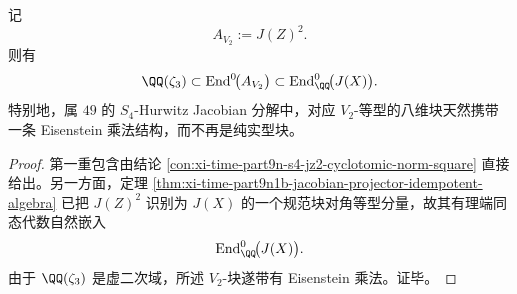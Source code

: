 \begin{corollary}\label{cor:xi-time-part9n1a-v2-block-eisenstein-multiplication}
记
\[
A_{V_2}:=J(Z)^2.
\]
则有
\[
\QQ(\zeta_3)\subset \operatorname{End}^0\!\bigl(A_{V_2}\bigr)
\subset
\operatorname{End}^0_{\QQ}\!\bigl(J(X)\bigr).
\]
特别地，属 \(49\) 的 \(S_4\)-Hurwitz Jacobian 分解中，对应 \(V_2\)-等型的八维块天然携带一条 Eisenstein 乘法结构，而不再是纯实型块。
\end{corollary}
\begin{proof}
第一重包含由结论 \ref{con:xi-time-part9n-s4-jz2-cyclotomic-norm-square} 直接给出。另一方面，定理 \ref{thm:xi-time-part9n1b-jacobian-projector-idempotent-algebra} 已把 \(J(Z)^2\) 识别为 \(J(X)\) 的一个规范块对角等型分量，故其有理端同态代数自然嵌入
\[
\operatorname{End}^0_{\QQ}\!\bigl(J(X)\bigr).
\]
由于 \(\QQ(\zeta_3)\) 是虚二次域，所述 \(V_2\)-块遂带有 Eisenstein 乘法。证毕。
\end{proof}

\endinput
